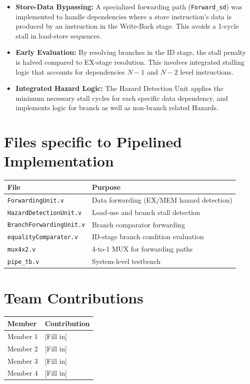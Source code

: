 \documentclass[12pt,a4paper]{article}
\begin{document}
\begin{itemize}
    \item \textbf{Store-Data Bypassing:} A specialized forwarding path (\texttt{Forward\_sd}) was implemented to handle dependencies where a store instruction's data is produced by an instruction in the Write-Back stage. This avoids a 1-cycle stall in load-store sequences.
    \item \textbf{Early Evaluation:} By resolving branches in the ID stage, the stall penalty is halved compared to EX-stage resolution. This involves integrated stalling logic that accounts for dependencies $N-1$ and $N-2$ level instructions.
    \item \textbf{Integrated Hazard Logic:} The Hazard Detection Unit applies the minimum necessary stall cycles for each specific data dependency, and implements logic for branch as well as non-branch related Hazards.
\end{itemize}

\section{Files specific to Pipelined Implementation}

\begin{center}
\begin{tabular}{ll}
    \toprule
    \textbf{File} & \textbf{Purpose} \\
    \midrule
    \texttt{ForwardingUnit.v} & Data forwarding (EX/MEM hazard detection) \\
    \texttt{HazardDetectionUnit.v} & Load-use and branch stall detection \\
    \texttt{BranchForwardingUnit.v} & Branch comparator forwarding \\
    \texttt{equalityComparator.v} & ID-stage branch condition evaluation \\
    \texttt{mux4x2.v} & 4-to-1 MUX for forwarding paths \\
    \texttt{pipe\_tb.v} & System-level testbench \\
    \bottomrule
\end{tabular}
\end{center}


\section{Team Contributions}

\begin{center}
\begin{tabular}{ll}
    \toprule
    \textbf{Member} & \textbf{Contribution} \\
    \midrule
    Member 1 & [Fill in] \\
    Member 2 & [Fill in] \\
    Member 3 & [Fill in] \\
    Member 4 & [Fill in] \\
    \bottomrule
\end{tabular}
\end{center}
\end{document}
